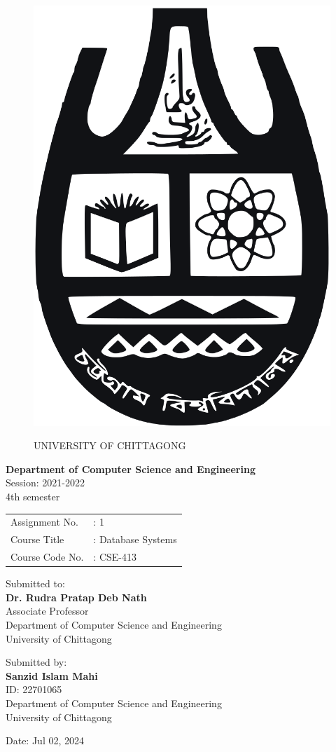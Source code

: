 
\begin{figure}[h]
		\vspace*{-1em}
		\centering
		\includegraphics[width=0.2\linewidth]{university_logo.png}
		\par
		\vspace*{2em}
		{\Large UNIVERSITY OF CHITTAGONG}
\end{figure}
\begin{center}
		\vspace*{3em}
		\textbf{Department of Computer Science and Engineering} \\
		\bigskip
		Session: 2021-2022 \\
		4th semester \\
		\bigskip
		\begin{tabular}{l l}
		  Assignment No. &: 1\\
		  Course Title &: Database Systems \\
		  Course Code No. &: CSE-413 \\
		\end{tabular}
\end{center}

\begin{center}
		\vspace*{3em}
		Submitted to: \\
		\textbf{Dr. Rudra Pratap Deb Nath} \\
		Associate Professor \\
		Department of Computer Science and Engineering \\
		University of Chittagong
\end{center}

\begin{center}
		\vspace*{3em}
		Submitted by: \\
		\textbf{Sanzid Islam Mahi} \\
		ID: 22701065 \\
		Department of Computer Science and Engineering \\
		University of Chittagong
\end{center}




\begin{center}
	\vspace*{3em}
	Date: Jul 02, 2024
\end{center}